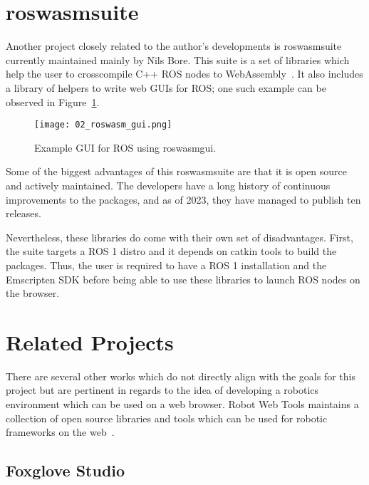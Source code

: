     \section{roswasm\smallunderscore  suite}

        Another project closely related to the author's developments is \textsf{roswasm\smallunderscore  suite} currently maintained mainly by Nils Bore. This suite is a set of libraries which help the user to cross\-compile C++ ROS nodes to WebAssembly~\cite{roswasmsuite}. It also includes a library of helpers to write web \ac{GUI}s for ROS; one such example can be observed in Figure~\ref{fig:roswasm_gui}.

        \begin{figure}[htbp]
            \centering
            \texttt{[image: 02\_roswasm\_gui.png]}
            \caption{Example \ac{GUI} for ROS using \textsf{roswasm\smallunderscore  gui}.}
            \label{fig:roswasm_gui}
        \end{figure}

        Some of the biggest advantages of this \textsf{roswasm\smallunderscore  suite} are that it is open source and actively maintained. The developers have a long history of continuous improvements to the packages, and as of 2023, they have managed to publish ten releases. 

        Nevertheless, these libraries do come with their own set of disadvantages. First, the suite targets a \ac{ROS} 1 distro and it depends on \textsf{catkin} tools to build the packages. Thus, the user is required to have a \ac{ROS} 1 installation and the Emscripten \ac{SDK} before being able to use these libraries to launch \ac{ROS} nodes on the browser.


\section{Related Projects}

    There are several other works which do not directly align with the goals for this project but are pertinent in regards to the idea of developing a robotics environment which can be used on a web browser. Robot Web Tools maintains a collection of open source libraries and tools which can be used for robotic frameworks on the web~\cite{robotwebtools}.
    
    \subsection{Foxglove Studio}


